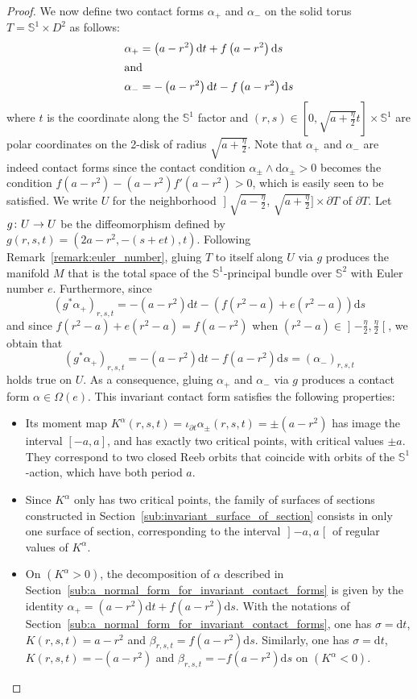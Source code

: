 \documentclass[10pt,a4paper]{amsart}
\newcommand{\bbS}{\mathbb{S}}
\newcommand{\rmd}{\mathrm{d}}
\renewcommand*{\to}{\mathchoice{\longrightarrow}{\rightarrow}{\rightarrow}{\rightarrow}}
\theoremstyle{definition}\newtheorem{defi}[theo]{Definition}
\begin{document}
\begin{proof}
We now define two contact forms $\alpha_+$ and $\alpha_-$ on the solid torus $T = \bbS^1 \times D^2$ as follows:
\begin{align*}
\alpha_+ &= \left(a-r^2\right)\rmd t + f\left(a-r^2\right) \rmd s
\\
\intertext{and}
\alpha_- &= -\left(a-r^2\right)\rmd t - f\left(a-r^2\right) \rmd s
\end{align*}
where $t$ is the coordinate along the $\bbS^1$ factor and $(r,s) \in [0, \sqrt{a+\frac{\eta}{2}}t] \times \bbS^1$ are polar coordinates on the 2-disk of radius $\sqrt{a+ \frac{\eta}{2}}$. Note that $\alpha_+$ and $\alpha_-$ are indeed contact forms since the contact condition $\alpha_\pm \wedge \rmd  \alpha_\pm > 0$ becomes the condition $f(a-r^2) - (a-r^2) f'(a-r^2) >0$, which is easily seen to be satisfied. We write $U$ for the neighborhood $\mathopen{]}\sqrt{a-\frac{\eta}{2}}$, $\sqrt{a+\frac{\eta}{2}}\mathclose{]} \times \partial T$ of $\partial T$. Let $g \colon U \to U$ be the diffeomorphism defined by $g(r,s,t) = (2a-r^2,-(s+et),t)$. Following Remark~\ref{remark:euler_number}, gluing $T$ to itself along $U$ via $g$ produces the manifold $M$ that is the total space of the $\bbS^1$-principal bundle over $\bbS^2$ with Euler number $e$. Furthermore, since
\[
\left(g^* \alpha_+\right)_{r,s,t} = -\left(a-r^2\right) \rmd t - \left(f\left(r^2-a\right) + e\left(r^2-a\right)\right) \rmd s
\]
and since $f(r^2-a) + e (r^2-a) = f(a-r^2)$ when $(r^2-a) \in\mathopen{]}- \frac{\eta}{2}, \frac{\eta}{2}\mathclose{[}$, we obtain that
\[
(g^* \alpha_+)_{r,s,t} = - \left(a-r^2\right) \rmd t - f\left(a-r^2\right) \rmd s = (\alpha_-)_{r,s,t}
\]
holds true on $U$. As a consequence, gluing $\alpha_+$ and $\alpha_-$ via $g$ produces a contact form $\alpha \in \Omega(e)$. This invariant contact form satisfies the following properties:
\begin{itemize}
\item Its moment map $K^\alpha(r,s,t) = \iota_{\partial t} \alpha_{\pm}(r,s,t) = \pm (a-r^2)$ has image the interval $[-a,a]$, and has exactly two critical points, with critical values $\pm a$. They correspond to two closed Reeb orbits that coincide with orbits of the $\bbS^1$-action, which have both period $a$.
\item Since $K^\alpha$ only has two critical points, the family of surfaces of sections constructed in Section~\ref{sub:invariant_surface_of_section} consists in only one surface of section, corresponding to the interval $\mathopen{]}-a,a\mathclose{[}$ of regular values of $K^\alpha$.
\item On $(K^\alpha>0)$, the decomposition of $\alpha$ described in Section~\ref{sub:a_normal_form_for_invariant_contact_forms} is given by the identity $\alpha_+ = (a-r^2)\rmd t + f(a-r^2) \rmd s$. With the notations of Section~\ref{sub:a_normal_form_for_invariant_contact_forms}, one has $\sigma = \rmd t$, $K(r,s,t)=a-r^2$ and $\beta_{r,s,t} = f(a-r^2)\rmd s$. Similarly, one has $\sigma = \rmd t$, $K(r,s,t)=-(a-r^2)$ and $\beta_{r,s,t} = -f(a-r^2)\rmd s$ on $(K^\alpha < 0)$.

\end{itemize}
\end{proof}
\end{document}
